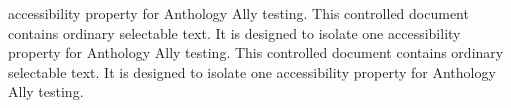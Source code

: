 \documentclass[11pt]{article}
\begin{document}
accessibility property for Anthology Ally testing. This controlled document contains ordinary selectable text. It is designed to isolate one accessibility property for Anthology Ally testing. This controlled document contains ordinary selectable text. It is designed to isolate one accessibility property for Anthology Ally testing. 
\end{document}
